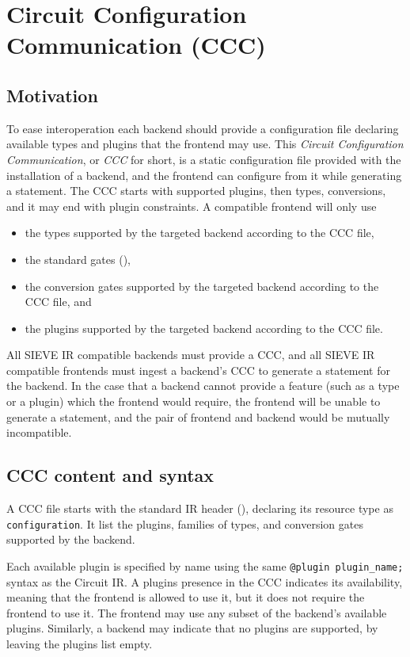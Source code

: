 
\section{Circuit Configuration Communication (CCC)}

\subsection{Motivation}

To ease interoperation each backend should provide a configuration file declaring available types and plugins that the frontend may use.
This \textit{Circuit Configuration Communication}, or \textit{CCC} for short, is a static configuration file provided with the installation of a backend, and the frontend can configure from it while generating a statement.
The CCC starts with supported plugins, then types, conversions, and it may end with plugin constraints.
A compatible frontend will only use
\begin{itemize}
    \item the types supported by the targeted backend according to the CCC file,
    \item the standard gates (),
    \item the conversion gates supported by the targeted backend according to the CCC file, and
    \item the plugins supported by the targeted backend according to the CCC file.
\end{itemize}

All SIEVE IR compatible backends must provide a CCC, and all SIEVE IR compatible frontends must ingest a backend's CCC to generate a statement for the backend.
In the case that a backend cannot provide a feature (such as a type or a plugin) which the frontend would require, the frontend will be unable to generate a statement, and the pair of frontend and backend would be mutually incompatible.

\subsection{CCC content and syntax}

% 
A CCC file starts with the standard IR header (), declaring its resource type as \texttt{configuration}.
It list the plugins, families of types, and conversion gates supported by the backend.

Each available plugin is specified by name using the same \texttt{@plugin plugin\_name;} syntax as the Circuit IR.
A plugins presence in the CCC indicates its availability, meaning that the frontend is allowed to use it, but it does not require the frontend to use it.
The frontend may use any subset of the backend's available plugins.
Similarly, a backend may indicate that no plugins are supported, by leaving the plugins list empty.


